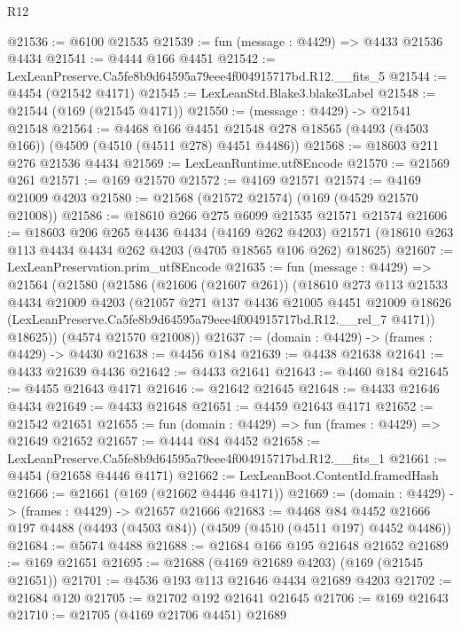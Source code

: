 \begin{lexlean}{R12}
\begin{coremodule}
@21536 := @6100 @21535
@21539 := fun (message : @4429) => @4433 @21536 @4434
@21541 := @4444 @166 @4451
@21542 := LexLeanPreserve.Ca5fe8b9d64595a79eee4f004915717bd.R12.__fits_5
@21544 := @4454 (@21542 @4171)
@21545 := LexLeanStd.Blake3.blake3Label
@21548 := @21544 (@169 (@21545 @4171))
@21550 := (message : @4429) -> @21541 @21548
@21564 := @4468
    @166
    @4451
    @21548
    @278
    @18565
    (@4493 (@4503 @166))
    (@4509 (@4510 (@4511 @278) @4451 @4486))
@21568 := @18603 @211 @276 @21536 @4434
@21569 := LexLeanRuntime.utf8Encode
@21570 := @21569 @261
@21571 := @169 @21570
@21572 := @4169 @21571
@21574 := @4169 @21009 @4203
@21580 := @21568 (@21572 @21574) (@169 (@4529 @21570 @21008))
@21586 := @18610 @266 @275 @6099 @21535 @21571 @21574
@21606 := @18603
    @206
    @265
    @4436
    @4434
    (@4169 @262 @4203)
    @21571
    (@18610 @263 @113 @4434 @4434 @262 @4203 (@4705 @18565 @106 @262) @18625)
@21607 := LexLeanPreservation.prim_utf8Encode
@21635 := fun (message : @4429) =>
  @21564
    (@21580
      (@21586
        (@21606 (@21607 @261))
        (@18610
          @273
          @113
          @21533
          @4434
          @21009
          @4203
          (@21057
            @271
            @137
            @4436
            @21005
            @4451
            @21009
            @18626
            (LexLeanPreserve.Ca5fe8b9d64595a79eee4f004915717bd.R12.__rel_7 @4171))
          @18625))
      (@4574 @21570 @21008))
@21637 := (domain : @4429) -> (frames : @4429) -> @4430
@21638 := @4456 @184
@21639 := @4438 @21638
@21641 := @4433 @21639 @4436
@21642 := @4433 @21641
@21643 := @4460 @184
@21645 := @4455 @21643 @4171
@21646 := @21642 @21645
@21648 := @4433 @21646 @4434
@21649 := @4433 @21648
@21651 := @4459 @21643 @4171
@21652 := @21542 @21651
@21655 := fun (domain : @4429) => fun (frames : @4429) => @21649 @21652
@21657 := @4444 @84 @4452
@21658 := LexLeanPreserve.Ca5fe8b9d64595a79eee4f004915717bd.R12.__fits_1
@21661 := @4454 (@21658 @4446 @4171)
@21662 := LexLeanBoot.ContentId.framedHash
@21666 := @21661 (@169 (@21662 @4446 @4171))
@21669 := (domain : @4429) -> (frames : @4429) -> @21657 @21666
@21683 := @4468
    @84
    @4452
    @21666
    @197
    @4488
    (@4493 (@4503 @84))
    (@4509 (@4510 (@4511 @197) @4452 @4486))
@21684 := @5674 @4488
@21688 := @21684 @166 @195 @21648 @21652
@21689 := @169 @21651
@21695 := @21688 (@4169 @21689 @4203) (@169 (@21545 @21651))
@21701 := @4536 @193 @113 @21646 @4434 @21689 @4203
@21702 := @21684 @120
@21705 := @21702 @192 @21641 @21645
@21706 := @169 @21643
@21710 := @21705 (@4169 @21706 @4451) @21689

\end{coremodule}
\end{lexlean}
